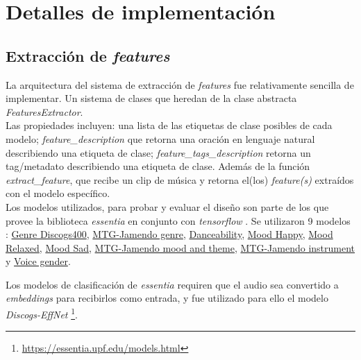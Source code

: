 \section{Detalles de implementación}
\label{sec:implementation}
\subsection{Extracción de \textit{features}}
\label{subsec:essentia}
La arquitectura del sistema de extracción de \textit{features} fue relativamente sencilla de implementar. Un sistema de clases que heredan de la clase abstracta \textit{FeaturesExtractor}. \\
Las propiedades incluyen: una lista de las etiquetas de clase posibles de cada modelo; \textit{feature\_description} que retorna una oración en lenguaje natural describiendo una etiqueta de clase; \textit{feature\_tags\_description} retorna un tag/metadato describiendo una etiqueta de clase. Además de la función \textit{extract\_feature}, que recibe un clip de música y retorna el(los) \textit{feature(s)} extraídos con el modelo específico. \\
Los modelos utilizados, para probar y evaluar el diseño son parte de los que provee la biblioteca \textit{essentia} en conjunto con \textit{tensorflow} \cite{alonso2020tensorflow}. Se utilizaron 9 modelos : \href{https://essentia.upf.edu/models.html#genre-discogs400}{Genre Discogs400}, \href{https://essentia.upf.edu/models.html#mtg-jamendo-genre}{MTG-Jamendo genre},  \href{https://essentia.upf.edu/models.html#danceability}{Danceability}, \href{https://essentia.upf.edu/models.html#mood-happy}{Mood Happy}, \href{https://essentia.upf.edu/models.html#mood-relaxed}{Mood Relaxed}, \href{https://essentia.upf.edu/models.html#mood-sad}{Mood Sad}, \href{https://essentia.upf.edu/models.html#mtg-jamendo-mood-and-theme}{MTG-Jamendo mood and theme}, \href{https://essentia.upf.edu/models.html#mtg-jamendo-instrument}{MTG-Jamendo instrument} y \href{https://essentia.upf.edu/models.html#voice-gender}{Voice gender}.

Los modelos de clasificación de \textit{essentia} requiren que el audio sea convertido a \textit{embeddings} para recibirlos como entrada, y fue utilizado para ello el modelo \textit{Discogs-EffNet} \footnote{\href{https://essentia.upf.edu/models.html}{https://essentia.upf.edu/models.html}}.

